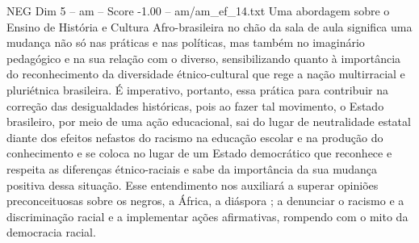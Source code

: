 \begin{textsample}{NEG Dim 5 – am – Score -1.00 – am/am\_ef\_14.txt}
Uma abordagem sobre o Ensino de História e Cultura Afro-brasileira no chão da sala de aula significa uma mudança não só nas práticas e nas políticas, mas também no imaginário pedagógico e na sua relação com o diverso, sensibilizando quanto à importância do reconhecimento da diversidade étnico-cultural que rege a nação multirracial e pluriétnica brasileira.
É imperativo, portanto, essa prática para contribuir na correção das desigualdades históricas, pois ao fazer tal movimento, o Estado brasileiro, por meio de uma ação educacional, sai do lugar de neutralidade estatal diante dos efeitos nefastos do racismo na educação escolar e na produção do conhecimento e se coloca no lugar de um Estado democrático que reconhece e respeita as diferenças étnico-raciais e sabe da importância da sua mudança positiva dessa situação.
Esse entendimento nos auxiliará a superar opiniões preconceituosas sobre os negros, a África, a diáspora ; a denunciar o racismo e a discriminação racial e a implementar ações afirmativas, rompendo com o mito da democracia racial.

\end{textsample}
